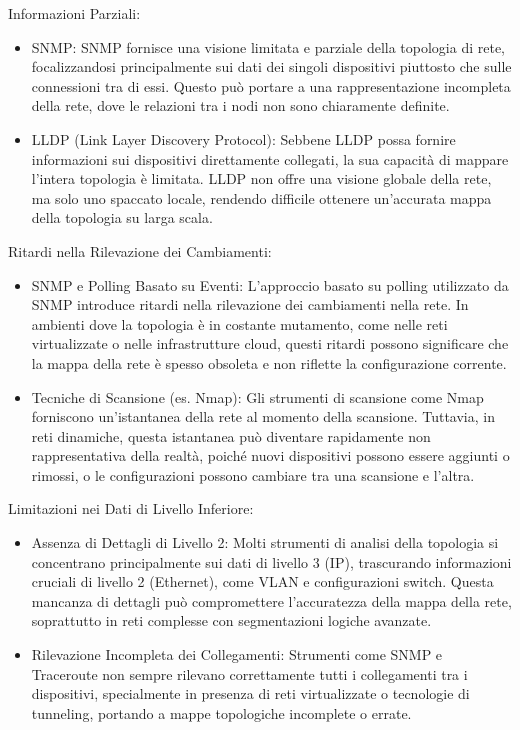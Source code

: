 \documentclass[target=bach,aauheader=,style=]{thud}
\begin{document}
Informazioni Parziali:
\begin{itemize}
  \item SNMP: SNMP fornisce una visione limitata e parziale della topologia di rete, focalizzandosi principalmente sui dati dei singoli dispositivi piuttosto che sulle connessioni tra di essi. Questo può portare a una rappresentazione incompleta della rete, dove le relazioni tra i nodi non sono chiaramente definite.
  \item LLDP (Link Layer Discovery Protocol): Sebbene LLDP possa fornire informazioni sui dispositivi direttamente collegati, la sua capacità di mappare l'intera topologia è limitata. LLDP non offre una visione globale della rete, ma solo uno spaccato locale, rendendo difficile ottenere un'accurata mappa della topologia su larga scala.

\end{itemize}
  Ritardi nella Rilevazione dei Cambiamenti:
\begin{itemize}
  \item SNMP e Polling Basato su Eventi: L'approccio basato su polling utilizzato da SNMP introduce ritardi nella rilevazione dei cambiamenti nella rete. In ambienti dove la topologia è in costante mutamento, come nelle reti virtualizzate o nelle infrastrutture cloud, questi ritardi possono significare che la mappa della rete è spesso obsoleta e non riflette la configurazione corrente.
  \item Tecniche di Scansione (es. Nmap): Gli strumenti di scansione come Nmap forniscono un'istantanea della rete al momento della scansione. Tuttavia, in reti dinamiche, questa istantanea può diventare rapidamente non rappresentativa della realtà, poiché nuovi dispositivi possono essere aggiunti o rimossi, o le configurazioni possono cambiare tra una scansione e l'altra.
\end{itemize}
Limitazioni nei Dati di Livello Inferiore:
\begin{itemize}
  \item Assenza di Dettagli di Livello 2: Molti strumenti di analisi della topologia si concentrano principalmente sui dati di livello 3 (IP), trascurando informazioni cruciali di livello 2 (Ethernet), come VLAN e configurazioni switch. Questa mancanza di dettagli può compromettere l'accuratezza della mappa della rete, soprattutto in reti complesse con segmentazioni logiche avanzate.
  \item Rilevazione Incompleta dei Collegamenti: Strumenti come SNMP e Traceroute non sempre rilevano correttamente tutti i collegamenti tra i dispositivi, specialmente in presenza di reti virtualizzate o tecnologie di tunneling, portando a mappe topologiche incomplete o errate.

\end{itemize}
\end{document}

